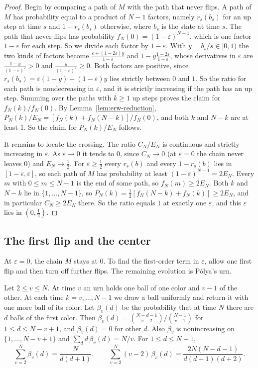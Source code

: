 \begin{proof}
Begin by comparing a path of $M$ with the path that never flips.
A path of $M$ has probability equal to a product of $N-1$ factors,
namely
$r_s(b_s)$ for an up step at time $s$ and $1-r_s(b_s)$ otherwise, where $b_s$
is the state at time $s$. The path that never flips has probability
$f_N(0)=(1-\varepsilon)^{N-1}$, which is one factor $1-\varepsilon$ for each
step. So we divide each factor by $1-\varepsilon$. With $y=b_s/s\in[0,1)$ the
two kinds of factors become
$\frac{\varepsilon+(1-2\varepsilon)y}{1-\varepsilon}$ and
$1-y\frac{1-2\varepsilon}{1-\varepsilon}$, whose derivatives in
$\varepsilon$ are $\frac{1-y}{(1-\varepsilon)^2}>0$ and
$\frac y{(1-\varepsilon)^2}\ge0$. Both factors are positive, since
$r_s(b_s)=\varepsilon(1-y)+(1-\varepsilon)y$ lies strictly between $0$ and $1$.
So the ratio for each path is nondecreasing in $\varepsilon$, and it is
strictly increasing if the path has an up step. Summing over the paths with
$k\ge1$ up steps proves the claim for $f_N(k)/f_N(0)$. By
Lemma~\ref{lem:erw-reduction},
$P_N(k)/E_N=[f_N(k)+f_N(N-k)]/f_N(0)$, and both $k$ and $N-k$ are at least $1$.
So the claim for $P_N(k)/E_N$ follows.

It remains to locate the crossing. The ratio $C_N/E_N$ is continuous and
strictly increasing in $\varepsilon$. As $\varepsilon\to0$ it tends to $0$,
since $C_N\to0$ (at $\varepsilon=0$ the chain never leaves $0$) and
$E_N\to\frac12$. For $\varepsilon\ge\frac12$ every $r_s(b)$ and every
$1-r_s(b)$ lies in $[1-\varepsilon,\varepsilon]$, so each path of $M$ has
probability at least $(1-\varepsilon)^{N-1}=2E_N$. Every $m$ with $0\le m\le N-1$ is
the end of some path, so $f_N(m)\ge2E_N$. Both $k$ and $N-k$ lie in
$\{1,\dots,N-1\}$, so $P_N(k)=\frac12[f_N(N-k)+f_N(k)]\ge2E_N$, and in particular
$C_N\ge2E_N$ there. So the ratio equals $1$ at exactly one $\varepsilon$, and
this $\varepsilon$ lies in $(0,\frac12)$.
\end{proof}

\subsection{The first flip and the center}

At $\varepsilon=0$, the chain $M$ stays at $0$.
To find the first-order term in $\varepsilon$, allow one first flip
and then turn off further flips. The remaining evolution is P\'olya's urn.

\begin{lemma}\label{lem:urn}
Let $2\le v\le N$. At time $v$ an urn holds one ball of one color and $v-1$
of the other. At each time $k=v,\dots,N-1$ we draw a ball uniformly and
return it with one more ball of its color. Let $\beta_v(d)$ be the
probability that at time $N$ there are $d$ balls of the first color. Then
$\beta_v(d)=\binom{N-d-1}{v-2}/\binom{N-1}{v-1}$ for $1\le d\le N-v+1$, and
$\beta_v(d)=0$ for other $d$. Also $\beta_v$ is nonincreasing on $\{1,\dots,N-v+1\}$ and
$\sum_dd\,\beta_v(d)=N/v$. For $1\le d\le N-1$,
\[
 \sum_{v=2}^N\beta_v(d)=\frac{N}{d(d+1)},\qquad
 \sum_{v=2}^N(v-2)\,\beta_v(d)=\frac{2N(N-d-1)}{d(d+1)(d+2)} .
\]
\end{lemma}

